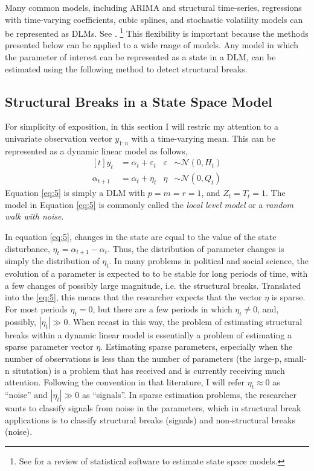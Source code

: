 \documentclass{article}
\newcommand{\dist}[1]{\mathcal{#1}}
\newcommand{\paren}[1]{\ensuremath{\left(#1\right)}}
\newcommand{\dnorm}[1]{\ensuremath{\dist{N}\paren{#1}}}
\begin{document}
Many common models, including ARIMA and structural time-series, regressions with time-varying coefficients, cubic splines, and stochastic volatility models can be represented as DLMs. 
See \parencites{WestHarrison1997}{DurbinKoopman2001}{PetrisPetroneEtAl2009}{CommandeurKoopman2007}.%
\footnote{See \textcite{CommandeurKoopmanOoms2011} for a review of statistical software to estimate state space models.}
This flexibility is important because the methods presented below can be applied to a wide range of models.
Any model in which the parameter of interest can be represented as a state in a DLM, can be estimated using the following method to detect structural breaks.

\subsection{Structural Breaks in a State Space Model}
\label{sec:struct-breaks-state}

For simplicity of exposition, in this section I will restric my attention to a univariate observation vector $y_{1:n}$ with a time-varying mean.
This can be represented as a dynamic linear model as follows,
\begin{equation}
  \label{eq:5}
  \begin{aligned}[t]
    y_{t} &= \alpha_{t} + \varepsilon_{t} & \varepsilon & \sim \dnorm{0, H_{t}} \\
    \alpha_{t + 1} &= \alpha_{t} + \eta_{t} & \eta & \sim \dnorm{0, Q_{t}}
  \end{aligned}
\end{equation}
Equation \eqref{eq:5} is simply a DLM with $p = m = r = 1$, and $Z_{t} = T_{t} = 1$.
The model in Equation \eqref{eq:5} is commonly called the \textit{local level model} or a \textit{random walk with noise}.

In equation \eqref{eq:5}, changes in the state are equal to the value of the state disturbance, $\eta_{t} = \alpha_{t+1} - \alpha_{t}$. 
Thus, the distribution of parameter changes is simply the distribution of $\eta_{t}$.
In many problems in political and social science, the evolution of a parameter is expected to to be stable for long periods of time, with a few changes of possibly large magnitude, i.e. the structural breaks.
Translated into the \eqref{eq:5}, this means that the researcher expects that the vector $\eta$ is sparse. 
For most periods $\eta_{t} = 0$, but there are a few periods in which $\eta_{t} \neq 0$, and, possibly,  $|\eta_{t}| \gg 0$.
When recast in this way, the problem of estimating structural breaks within a dynamic linear model is essentially a problem of estimating a sparse parameter vector $\eta$.
Estimating sparse parameters, especially when the number of observations is less than the number of parameters (the large-p, small-n situtation) is a problem that has received and is currently receiving much attention.
Following the convention in that literature, I will refer $\eta_{t} \approx 0$ as ``noise'' and $|\eta_{t}| \gg 0$ as ``signals''.
In sparse estimation problems, the researcher wants to classify signals from noise in the parameters, which in structural break applications is to classify structural breaks (signals) and non-structural breaks (noise).
\end{document}
